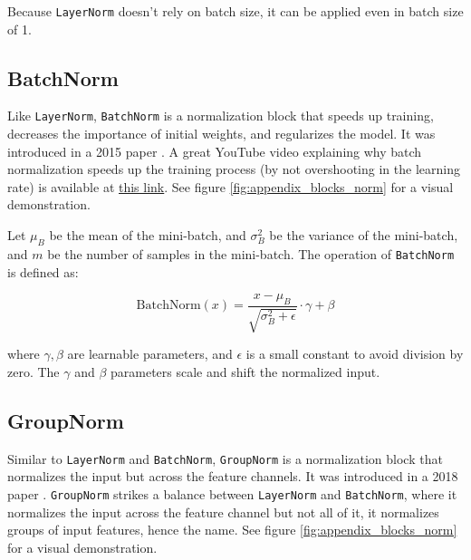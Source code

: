 Because \texttt{LayerNorm} doesn't rely on batch size, it can be applied even in batch size of 1.








\subsection*{BatchNorm}

Like \texttt{LayerNorm}, \texttt{BatchNorm} is a normalization block that speeds up training, decreases the importance of initial weights, and regularizes the model. It was introduced in a 2015 paper \cite{batchnorm}. A great YouTube video explaining why batch normalization speeds up the training process (by not overshooting in the learning rate) is available at \href{https://www.youtube.com/watch?v=DtEq44FTPM4}{this link}. See figure \ref{fig:appendix_blocks_norm} for a visual demonstration.

Let $\mu_B$ be the mean of the mini-batch, and $\sigma^2_B$ be the variance of the mini-batch, and $m$ be the number of samples in the mini-batch. The operation of \texttt{BatchNorm} is defined as:

\begin{equation*}
    \text{BatchNorm}(x) = \frac{x - \mu_B}{\sqrt{\sigma^2_B + \epsilon}} \cdot \gamma + \beta
\end{equation*}

where $\gamma, \beta$ are learnable parameters, and $\epsilon$ is a small constant to avoid division by zero. The $\gamma$ and $\beta$ parameters scale and shift the normalized input.








\subsection*{GroupNorm}

Similar to \texttt{LayerNorm} and \texttt{BatchNorm}, \texttt{GroupNorm} is a normalization block that normalizes the input but across the feature channels. It was introduced in a 2018 paper \cite{wu2018group}. \texttt{GroupNorm} strikes a balance between \texttt{LayerNorm} and \texttt{BatchNorm}, where it normalizes the input across the feature channel but not all of it, it normalizes groups of input features, hence the name. See figure \ref{fig:appendix_blocks_norm} for a visual demonstration.

